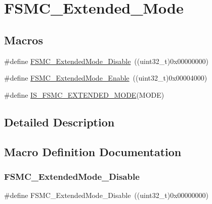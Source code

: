\hypertarget{group___f_s_m_c___extended___mode}{}\section{F\+S\+M\+C\+\_\+\+Extended\+\_\+\+Mode}
\label{group___f_s_m_c___extended___mode}
\subsection*{Macros}
\begin{DoxyCompactItemize}
\item 
\#define \mbox{\hyperlink{group___f_s_m_c___extended___mode_ga5a1f1acdc44328158f59012748980dd3}{F\+S\+M\+C\+\_\+\+Extended\+Mode\+\_\+\+Disable}}~((uint32\+\_\+t)0x00000000)
\item 
\#define \mbox{\hyperlink{group___f_s_m_c___extended___mode_gaef9ff4c81a52fdb0471d2c4422271d2a}{F\+S\+M\+C\+\_\+\+Extended\+Mode\+\_\+\+Enable}}~((uint32\+\_\+t)0x00004000)
\item 
\#define \mbox{\hyperlink{group___f_s_m_c___extended___mode_ga79849ea07bf2a8f09989a6babd9e66e2}{I\+S\+\_\+\+F\+S\+M\+C\+\_\+\+E\+X\+T\+E\+N\+D\+E\+D\+\_\+\+M\+O\+DE}}(M\+O\+DE)
\end{DoxyCompactItemize}


\subsection{Detailed Description}


\subsection{Macro Definition Documentation}
\mbox{\label{group___f_s_m_c___extended___mode_ga5a1f1acdc44328158f59012748980dd3}} 
\subsubsection{\texorpdfstring{FSMC\_ExtendedMode\_Disable}{FSMC\_ExtendedMode\_Disable}}
{\footnotesize\ttfamily \#define F\+S\+M\+C\+\_\+\+Extended\+Mode\+\_\+\+Disable~((uint32\+\_\+t)0x00000000)}

\mbox{\label{group___f_s_m_c___extended___mode_gaef9ff4c81a52fdb0471d2c4422271d2a}} 
